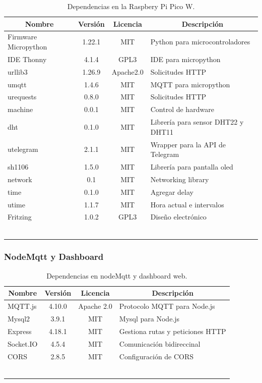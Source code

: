 \footnotesize%
\begin{longtable}[c]{@{}lccl@{}}
\toprule
\multicolumn{1}{c}{\textbf{Nombre}} & \textbf{Versión} & \textbf{Licencia} & \multicolumn{1}{c}{\textbf{Descripción}} \\ \midrule
\endfirsthead
%
\endhead
%
\bottomrule
\endfoot
%
\endlastfoot
%
Firmware Micropython & 1.22.1 & MIT & Python para microcontroladores\\
IDE Thonny & 4.1.4 & GPL3 & IDE para micropython\\
urllib3 & 1.26.9 & Apache2.0 & Solicitudes HTTP \\
umqtt & 1.4.6 & MIT & MQTT para micropython\\
urequests & 0.8.0 & MIT & Solicitudes HTTP\\
machine & 0.0.1 & MIT & Control de hardware\\
dht & 0.1.0 & MIT & Librería para sensor DHT22 y DHT11\\
utelegram & 2.1.1 & MIT & Wrapper para la API de Telegram\\
sh1106 & 1.5.0 & MIT & Librería para pantalla oled\\
network & 0.1 & MIT & Networking library \\
time & 0.1.0 & MIT & Agregar delay\\
utime & 1.1.7 & MIT & Hora actual e intervalos\\
Fritzing & 1.0.2 & GPL3 & Diseño electrónico\\
\bottomrule~\\
\caption{Dependencias en la Raspbery Pi Pico W.}
\label{tab:BackEnd}
\end{longtable}
\normalsize

\subsubsection{NodeMqtt y Dashboard}

\footnotesize%
\begin{longtable}[c]{@{}lccl@{}}
\toprule
\multicolumn{1}{c}{\textbf{Nombre}} & \textbf{Versión} & \textbf{Licencia} & \multicolumn{1}{c}{\textbf{Descripción}} \\ \midrule
\endfirsthead
%
\endhead
%
\bottomrule
\endfoot
%
\endlastfoot
%
MQTT.js & 4.10.0 & Apache 2.0 & Protocolo MQTT para Node.js\\
Mysql2 & 3.9.1 & MIT & Mysql para Node.js\\
Express & 4.18.1 & MIT &  Gestiona rutas y peticiones HTTP\\
Socket.IO & 4.5.4 & MIT & Comunicación bidireccinal\\
CORS & 2.8.5 & MIT & Configuración de CORS\\
\bottomrule~\\
\caption{Dependencias en nodeMqtt y dashboard web.}
\label{tab:BackEnd}
\end{longtable}
\normalsize

